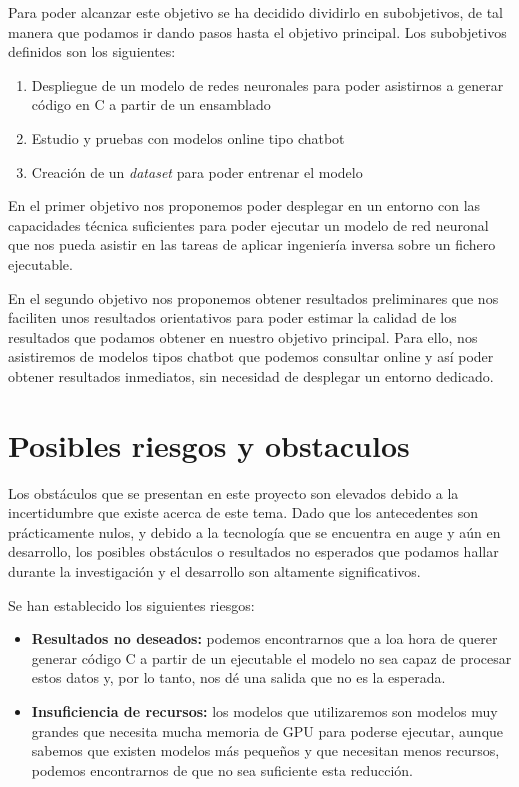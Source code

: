 Para poder alcanzar este objetivo se ha decidido dividirlo en subobjetivos, de tal
manera que podamos ir dando pasos hasta el objetivo principal. Los subobjetivos definidos
son los siguientes:

\begin{enumerate}
    \item Despliegue de un modelo de redes neuronales para poder asistirnos a generar
        código en C a partir de un ensamblado
    \item Estudio y pruebas con modelos online tipo chatbot
    \item Creación de un \textit{dataset} para poder entrenar el modelo
\end{enumerate}

En el primer objetivo nos proponemos poder desplegar en un entorno con las capacidades
técnica suficientes para poder ejecutar un modelo de red neuronal que nos pueda asistir en
las tareas de aplicar ingeniería inversa sobre un fichero ejecutable.

En el segundo objetivo nos proponemos obtener resultados preliminares que nos faciliten
unos resultados orientativos para poder estimar la calidad de los resultados que podamos
obtener en nuestro objetivo principal. Para ello, nos asistiremos de modelos tipos chatbot
que podemos consultar online y así poder obtener resultados inmediatos, sin necesidad
de desplegar un entorno dedicado.

\section{Posibles riesgos y obstaculos}
\label{sec:riesgos}


Los obstáculos que se presentan en este proyecto son elevados debido a la incertidumbre
que existe acerca de este tema. Dado que los antecedentes son prácticamente nulos, y
debido a la tecnología que se encuentra en auge y aún en desarrollo, los posibles obstáculos
o resultados no esperados que podamos hallar durante la investigación y el desarrollo
son altamente significativos.

Se han establecido los siguientes riesgos:

\begin{itemize}
    \item \textbf{Resultados no deseados:} podemos encontrarnos que a loa hora de querer
        generar código C a partir de un ejecutable el modelo no sea capaz de procesar estos datos
        y, por lo tanto, nos dé una salida que no es la esperada.
    \item \textbf{Insuficiencia de recursos:} los modelos que utilizaremos son modelos
        muy grandes que necesita mucha memoria de GPU para poderse ejecutar, aunque sabemos que
        existen modelos más pequeños y que necesitan menos recursos, podemos encontrarnos de
        que no sea suficiente esta reducción.
\end{itemize}

